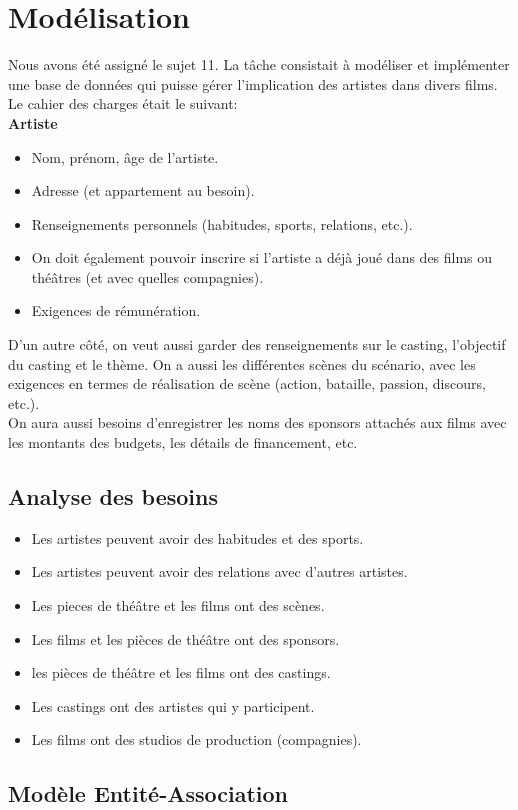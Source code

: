 \documentclass{article}
\newcommand{\n}{\\ [6pt]}
\begin{document}
\section{Modélisation}
Nous avons été assigné le sujet 11. La tâche consistait à modéliser
et implémenter une base de données qui puisse gérer l’implication des
artistes dans divers films.\n
Le cahier des charges était le suivant:\n
\textbf{Artiste}
\begin{itemize}
\item Nom, prénom, âge de l’artiste.
\item Adresse (et appartement au besoin).
\item Renseignements personnels (habitudes, sports, relations, etc.). 
\item On doit également pouvoir inscrire si l’artiste a déjà joué dans des films ou théâtres (et avec quelles compagnies). 
\item Exigences de rémunération.
\end{itemize}

D’un autre côté, on veut aussi garder des renseignements sur le casting, l’objectif du casting et le thème. On a aussi les différentes scènes du scénario, avec les exigences en termes de réalisation de scène (action, bataille, passion, discours, etc.).\n
On aura aussi besoins d’enregistrer les noms des sponsors attachés aux
films avec les montants des budgets, les détails de financement,
etc.\n


\subsection{Analyse des besoins}
\begin{itemize}
\item Les artistes peuvent avoir des habitudes et des sports.
\item Les artistes peuvent avoir des relations avec d'autres artistes.
\item Les pieces de théâtre et les films ont des scènes.
\item Les films et les pièces de théâtre ont des sponsors.
\item les pièces de théâtre et les films ont des castings.
\item Les castings ont des artistes qui y participent.
\item Les films ont des studios de production (compagnies).
\end{itemize}

  
\subsection{Modèle Entité-Association}
\end{document}
